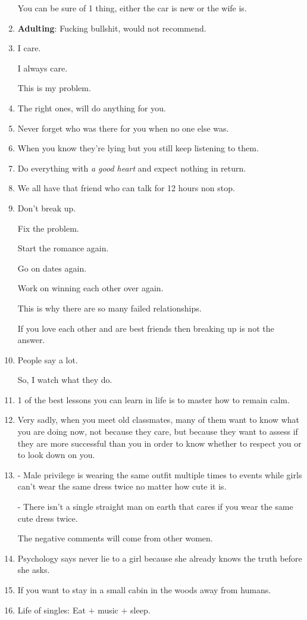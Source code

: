 \documentclass{article}
\begin{document}
\begin{enumerate}
	You can be sure of 1 thing, either the car is new or the wife is.
	\item \textbf{Adulting}: Fucking bullshit, would not recommend.
	\item I care.
	
	I always care.
	
	This is my problem.
	\item The right ones, will do anything for you.
	\item Never forget who was there for you when no one else was.
	\item When you know they're lying but you still keep listening to them.
	\item Do everything with \textit{a good heart} and expect nothing in return.
	\item We all have that friend who can talk for 12 hours non stop.
	\item Don't break up.
	
	Fix the problem.
	
	Start the romance again.
	
	Go on dates again.
	
	Work on winning each other over again.
	
	This is why there are so many failed relationships.
	
	If you love each other and are best friends then breaking up is not the answer.
	\item People say a lot.
	
	So, I watch what they do.
	\item 1 of the best lessons you can learn in life is to master how to remain calm.
	\item Very sadly, when you meet old classmates, many of them want to know what you are doing now, not because they care, but because they want to assess if they are more successful than you in order to know whether to respect you or to look down on you.
	\item - Male privilege is wearing the same outfit multiple times to events while girls can't wear the same dress twice no matter how cute it is.
	
	- There isn't a single straight man on earth that cares if you wear the same cute dress twice.
	
	The negative comments will come from other women.
	\item Psychology says never lie to a girl because she already knows the truth before she asks.
	\item If you want to stay in a small cabin in the woods away from humans.
	\item Life of singles: Eat $+$ music $+$ sleep.
	

\end{enumerate}
\end{document}
